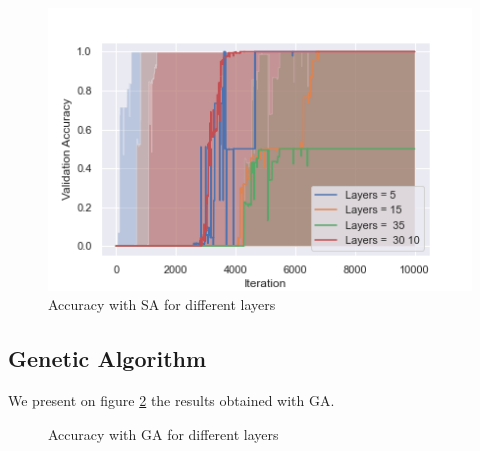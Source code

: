 \documentclass[10pt]{article}
\begin{document}
			\begin{figure}
				\centering
				\includegraphics[width=0.45\linewidth]{../graphics/g_SA_Iteration_Test_Error_Layers.png}
				\caption{Accuracy with SA for different layers}
				\label{g:sa}
			\end{figure}
		\subsection{Genetic Algorithm}
			We present on figure \ref{g:ga} the results obtained with GA.

			\begin{figure}
				\centering
				\caption{Accuracy with GA for different layers}
				\label{g:ga}
			\end{figure}
\end{document}
